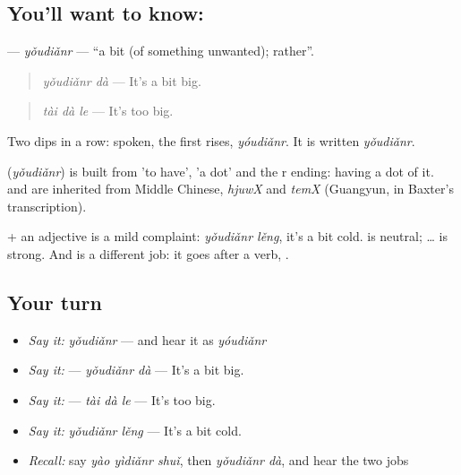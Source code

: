 \subsection*{You'll want to know: }
\textbf{} — \emph{yǒudiǎnr} — \textquotedblleft{}a bit (of something unwanted); rather\textquotedblright{}.

\begin{quote}
\textbf{} \emph{yǒudiǎnr dà} — It's a bit big.
\end{quote}

\begin{quote}
\textbf{} \emph{tài dà le} — It's too big.
\end{quote}

Two dips in a row: spoken, the first rises, \emph{yóudiǎnr}. It is written \emph{yǒudiǎnr}.

\begin{cousinweb}
\textbf{} (\emph{yǒudiǎnr}) is built from  'to have',  'a dot' and the r ending: having a dot of it.  and  are inherited from Middle Chinese, \emph{hjuwX} and \emph{temX} (Guangyun, in Baxter's transcription).
\end{cousinweb}

\begin{grammarlens}[title={What you've built}]
 + an adjective is a mild complaint: \emph{yǒudiǎnr lěng}, it's a bit cold.  is neutral;  …  is strong. And  is a different job: it goes after a verb, .
\end{grammarlens}

\subsection*{Your turn}
\begin{itemize}
\raggedright
  \item \emph{Say it:} \emph{yǒudiǎnr} — and hear it as \emph{yóudiǎnr}
  \item \emph{Say it:}  — \emph{yǒudiǎnr dà} — It's a bit big.
  \item \emph{Say it:}  — \emph{tài dà le} — It's too big.
  \item \emph{Say it:} \emph{yǒudiǎnr lěng} — It's a bit cold.
  \item \emph{Recall:} say \emph{yào yìdiǎnr shuǐ}, then \emph{yǒudiǎnr dà}, and hear the two jobs
\end{itemize}

